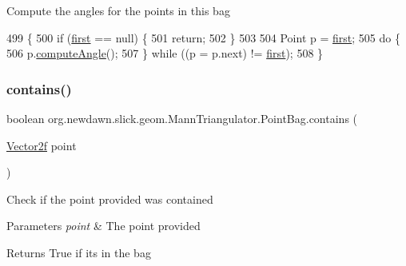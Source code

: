 Compute the angles for the points in this bag 
\begin{DoxyCode}
499                                     \{
500             \textcolor{keywordflow}{if} (\mbox{\hyperlink{classorg_1_1newdawn_1_1slick_1_1geom_1_1_mann_triangulator_1_1_point_bag_a120e5163711d94563be103af953fe059}{first}} == null) \{
501                 \textcolor{keywordflow}{return};
502             \}
503 
504             Point p = \mbox{\hyperlink{classorg_1_1newdawn_1_1slick_1_1geom_1_1_mann_triangulator_1_1_point_bag_a120e5163711d94563be103af953fe059}{first}};
505             \textcolor{keywordflow}{do} \{
506                 p.\mbox{\hyperlink{classorg_1_1newdawn_1_1slick_1_1geom_1_1_mann_triangulator_1_1_point_a61201245a3be65aae48cc8a678e7d4ac}{computeAngle}}();
507             \} \textcolor{keywordflow}{while} ((p = p.next) != \mbox{\hyperlink{classorg_1_1newdawn_1_1slick_1_1geom_1_1_mann_triangulator_1_1_point_bag_a120e5163711d94563be103af953fe059}{first}});
508         \}
\end{DoxyCode}
\mbox{\label{classorg_1_1newdawn_1_1slick_1_1geom_1_1_mann_triangulator_1_1_point_bag_aa6ec224f791da0d76127b41cd216b977}} 
\subsubsection{\texorpdfstring{contains()}{contains()}}
{\footnotesize\ttfamily boolean org.\+newdawn.\+slick.\+geom.\+Mann\+Triangulator.\+Point\+Bag.\+contains (\begin{DoxyParamCaption}\item[{\mbox{\hyperlink{classorg_1_1newdawn_1_1slick_1_1geom_1_1_vector2f}{Vector2f}}}]{point }\end{DoxyParamCaption})\hspace{0.3cm}{\ttfamily [inline]}}

Check if the point provided was contained


\begin{DoxyParams}{Parameters}
{\em point} & The point provided \\
\hline
\end{DoxyParams}
\begin{DoxyReturn}{Returns}
True if it\textquotesingle{}s in the bag 
\end{DoxyReturn}

